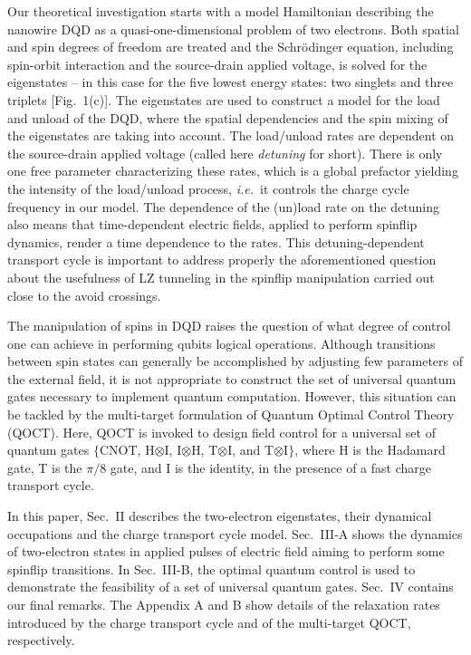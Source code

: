 \documentclass[prb,twocolumn,showpacs,floats]{revtex4}
\begin{document}
Our theoretical investigation starts with a model Hamiltonian describing the nanowire DQD
as a quasi-one-dimensional problem of two electrons. Both spatial and spin degrees of freedom
are treated and the Schr\"odinger equation, including spin-orbit interaction and the source-drain applied voltage, 
 is solved for the eigenstates -- in this case for the five lowest energy states: two singlets 
 and three triplets [Fig.~1(c)].
 The eigenstates are used to construct a model for the load and unload of the DQD, where the spatial dependencies and the spin mixing of the eigenstates are taking into account. The load/unload rates
 are dependent on the source-drain applied voltage (called here {\it detuning} for short). There
 is only one free parameter characterizing these rates, which is a global prefactor yielding the 
 intensity of the load/unload process, \textit{i.e.}~it controls the charge cycle frequency in our model.
 The dependence of the (un)load rate on the detuning also means that time-dependent electric fields, applied to
 perform spinflip dynamics, render a time dependence to the rates. This detuning-dependent
 transport cycle is important to address properly the aforementioned question about the
 usefulness of LZ tunneling in the spinflip manipulation carried out close to the avoid crossings.\cite{hugo2}
 
  The manipulation of spins in DQD raises the question of what degree of control one can achieve in performing qubits logical operations. Although transitions between spin states can generally be accomplished by adjusting few parameters of the external field,  it is not appropriate to construct the set of 
universal quantum gates necessary to implement quantum computation.\cite{nielsen}  However, this situation can be tackled by the multi-target formulation of Quantum Optimal Control Theory (QOCT).\cite{multitarget,Kosloff}
 Here, QOCT is invoked to design field control for
 a universal set of quantum gates $\{$CNOT, H$\otimes$I, I$\otimes$H, T$\otimes$I, and T$\otimes$I$\}$, 
where H is the Hadamard gate, T is the $\pi/8$ gate, and I is the identity, in the presence of a fast charge 
transport cycle.
 
 In this paper, Sec.~II describes the two-electron eigenstates, their dynamical occupations and the 
charge transport cycle model. Sec.~III-A
 shows the dynamics of two-electron states in applied pulses of electric field aiming
 to perform some spinflip transitions. In Sec.~III-B, the optimal quantum control is used to
 demonstrate the feasibility of a set of universal quantum gates.
 Sec.~IV contains our final remarks. The Appendix A and B show details of the relaxation rates introduced by the charge transport cycle and of the multi-target QOCT, respectively.
 
\end{document}
